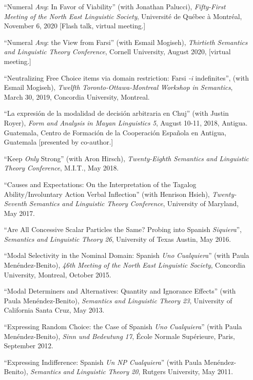 \documentclass[11pt]{article}
\begin{document}
``Numeral
\textit{Any}: In Favor of Viability'' (with Jonathan Palucci),  \textit{Fifty-First Meeting of the
  North East Linguistic Society}, Universit\'e de Qu\'ebec \`a
Montr\'eal, November 6, 2020 [Flash talk, virtual meeting.]

``Numeral \textit{Any}: the View from Farsi'' (with Esmail Mogiseh), \textit{Thirtieth Semantics and Linguistic Theory Conference}, Cornell University, August 2020, [virtual meeting.]

``Neutralizing Free Choice items via domain restriction: Farsi \textit{-i} indefinites'', (with Esmail Mogiseh), \textit{Twelfth Toronto-Ottawa-Montreal Workshop in Semantics}, March 30, 2019, Concordia University, Montreal.

``La expresi\'on de la modalidad de decisi\'on arbitraria en Chuj'' (with Justin Royer), \textit{Form and Analysis in Mayan Linguistics 5}, August 10-11, 2018, Antigua. Guatemala, Centro de Formaci\'on de la Cooperaci\'on Espa\~nola en Antigua, Guatemala [presented by co-author.]

``Keep \textit{Only} Strong'' (with Aron Hirsch), \textit{Twenty-Eighth Semantics and Linguistic Theory Conference}, M.I.T., May 2018. 

``Causes and Expectations: On the Interpretation of the Tagalog Ability/Involuntary Action Verbal Inflection'' (with Henrison Hsieh), \textit{Twenty-Seventh Semantics and Linguistic Theory Conference}, University of Maryland, May 2017. 


``Are All Concessive Scalar Particles the Same? Probing into Spanish \textit{Siquiera}'', \textit{Semantics and Linguistic Theory 26}, University of Texas Austin, May 2016. 

``Modal Selectivity in the Nominal Domain: Spanish \textit{Uno Cualquiera}'' (with Paula Men\'endez-Benito), \textit{46th Meeting of the North East Linguistic Society}, Concordia University, Montreal, October 2015. 

``Modal Determiners and Alternatives: Quantity and Ignorance
Effects'' (with Paula Men\'endez-Benito), \textit{Semantics and
  Linguistic Theory 23}, University of California Santa Cruz, May 2013. 

``Expressing Random
Choice: the Case of Spanish \textit{Uno Cualquiera}''  (with Paula Men\'endez-Benito), \textit{Sinn
  und Bedeutung 17}, \'{E}cole Normale Sup\'{e}rieure, Paris, September 2012.

``Expressing Indifference: Spanish \textit{Un NP
  Cualquiera}'' (with Paula Men\'endez-Benito), \textit{Semantics and
Linguistic Theory 20}, Rutgers University, May 2011. 
\end{document}
